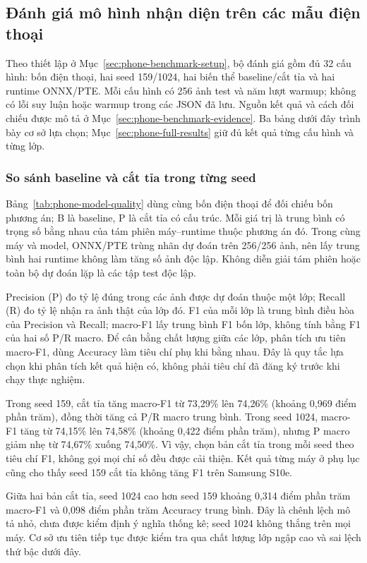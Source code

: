 \subsection{Đánh giá mô hình nhận diện trên các mẫu điện thoại}\label{sec:phone-benchmark-results}
Theo thiết lập ở Mục~\ref{sec:phone-benchmark-setup}, bộ đánh giá gồm đủ 32 cấu hình: bốn điện thoại, hai seed 159/1024, hai biến thể baseline/cắt tỉa và hai runtime ONNX/PTE. Mỗi cấu hình có 256 ảnh test và năm lượt warmup; không có lỗi suy luận hoặc warmup trong các JSON đã lưu. Nguồn kết quả và cách đối chiếu được mô tả ở Mục~\ref{sec:phone-benchmark-evidence}. Ba bảng dưới đây trình bày cơ sở lựa chọn; Mục~\ref{sec:phone-full-results} giữ đủ kết quả từng cấu hình và từng lớp.

\subsubsection{So sánh baseline và cắt tỉa trong từng seed}
Bảng~\ref{tab:phone-model-quality} dùng cùng bốn điện thoại để đối chiếu bốn phương án; B là baseline, P là cắt tỉa có cấu trúc. Mỗi giá trị là trung bình có trọng số bằng nhau của tám phiên máy--runtime thuộc phương án đó. Trong cùng máy và model, ONNX/PTE trùng nhãn dự đoán trên 256/256 ảnh, nên lấy trung bình hai runtime không làm tăng số ảnh độc lập. Không diễn giải tám phiên hoặc toàn bộ dự đoán lặp là các tập test độc lập.



Precision (P) đo tỷ lệ đúng trong các ảnh được dự đoán thuộc một lớp; Recall (R) đo tỷ lệ nhận ra ảnh thật của lớp đó. F1 của mỗi lớp là trung bình điều hòa của Precision và Recall; macro-F1 lấy trung bình F1 bốn lớp, không tính bằng F1 của hai số P/R macro. Để cân bằng chất lượng giữa các lớp, phân tích ưu tiên macro-F1, dùng Accuracy làm tiêu chí phụ khi bằng nhau. Đây là quy tắc lựa chọn khi phân tích kết quả hiện có, không phải tiêu chí đã đăng ký trước khi chạy thực nghiệm.

Trong seed 159, cắt tỉa tăng macro-F1 từ 73,29\% lên 74,26\% (khoảng 0,969 điểm phần trăm), đồng thời tăng cả P/R macro trung bình. Trong seed 1024, macro-F1 tăng từ 74,15\% lên 74,58\% (khoảng 0,422 điểm phần trăm), nhưng P macro giảm nhẹ từ 74,67\% xuống 74,50\%. Vì vậy, chọn bản cắt tỉa trong mỗi seed theo tiêu chí F1, không gọi mọi chỉ số đều được cải thiện. Kết quả từng máy ở phụ lục cũng cho thấy seed 159 cắt tỉa không tăng F1 trên Samsung S10e.

Giữa hai bản cắt tỉa, seed 1024 cao hơn seed 159 khoảng 0,314 điểm phần trăm macro-F1 và 0,098 điểm phần trăm Accuracy trung bình. Đây là chênh lệch mô tả nhỏ, chưa được kiểm định ý nghĩa thống kê; seed 1024 không thắng trên mọi máy. Cơ sở ưu tiên tiếp tục được kiểm tra qua chất lượng lớp ngập cao và sai lệch thứ bậc dưới đây.

